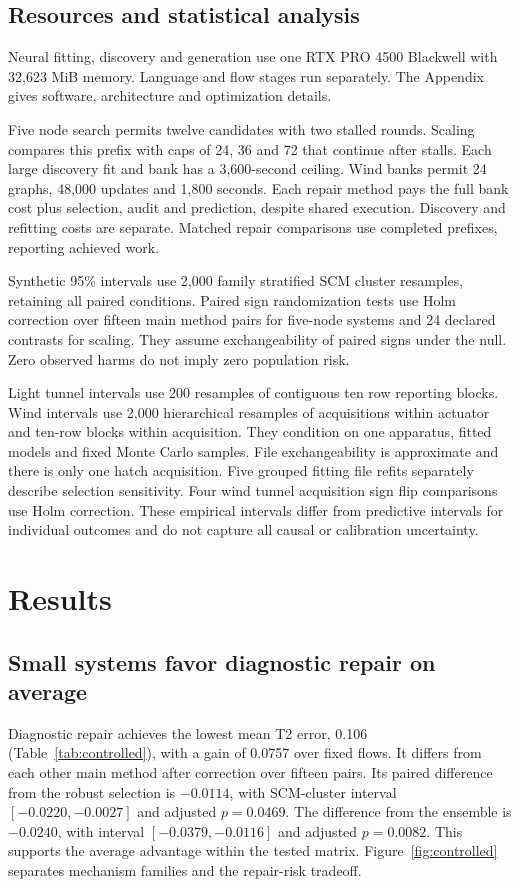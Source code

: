\documentclass{svproc}
\begin{document}
\subsection{Resources and statistical analysis}
Neural fitting, discovery and generation use one RTX PRO 4500 Blackwell with
32,623 MiB memory. Language and flow stages run separately. The Appendix gives
software, architecture and optimization details.

Five node search permits twelve candidates with two stalled rounds. Scaling
compares this prefix with caps of 24, 36 and 72 that continue after stalls.
Each large discovery fit and bank has a 3,600-second ceiling. Wind banks permit
24 graphs, 48,000 updates and 1,800 seconds. Each repair method pays the full
bank cost plus selection, audit and prediction, despite shared execution.
Discovery and refitting costs are separate. Matched repair comparisons use
completed prefixes, reporting achieved work.

Synthetic 95\% intervals use 2,000 family stratified SCM cluster resamples,
retaining all paired conditions. Paired sign randomization tests use Holm
correction \cite{holm1979} over fifteen main method pairs for five-node systems
and 24 declared contrasts for scaling. They assume exchangeability of paired
signs under the null. Zero observed harms do not imply zero population risk.

Light tunnel intervals use 200 resamples of contiguous ten row reporting blocks.
Wind intervals use 2,000 hierarchical resamples of acquisitions within actuator
and ten-row blocks within acquisition. They condition on one apparatus, fitted
models and fixed Monte Carlo samples. File exchangeability is approximate and
there is only one hatch acquisition. Five grouped fitting file refits separately
describe selection sensitivity. Four wind tunnel acquisition sign flip comparisons
use Holm correction. These empirical intervals differ from predictive intervals
for individual outcomes and do not capture all causal or calibration uncertainty.


\section{Results}
\subsection{Small systems favor diagnostic repair on average}
Diagnostic repair achieves the lowest mean T2 error, 0.106
(Table~\ref{tab:controlled}), with a gain of 0.0757 over fixed flows. It differs
from each other main method after correction over fifteen pairs. Its paired
difference from the robust selection is $-0.0114$, with SCM-cluster interval
$[-0.0220,-0.0027]$ and adjusted $p=0.0469$. The difference from the ensemble is
$-0.0240$, with interval $[-0.0379,-0.0116]$ and adjusted $p=0.0082$. This supports
the average advantage within the tested matrix. Figure~\ref{fig:controlled}
separates mechanism families and the repair-risk tradeoff.
\end{document}
